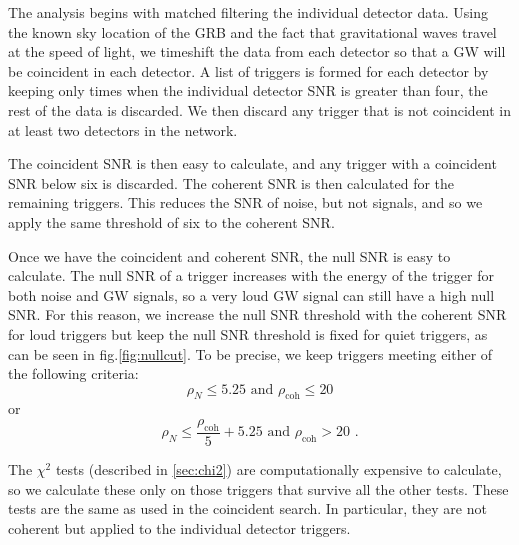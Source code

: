 \documentclass[11pt]{cuthesis}
\newcommand{\fs}{\text{ .}}
\begin{document}
The analysis begins with matched filtering the individual detector data. Using the known sky location of the GRB and the fact that gravitational waves travel at the speed of light, we timeshift the data from each detector so that a GW will be coincident in each detector. A list of triggers is formed for each detector by keeping only times when the individual detector SNR is greater than four, the rest of the data is discarded. We then discard any trigger that is not coincident in at least two detectors in the network. 

The coincident SNR is then easy to calculate, and any trigger with a coincident SNR below six is discarded. The coherent SNR is then calculated for the remaining triggers. This reduces the SNR of noise, but not signals, and so we apply the same threshold of six to the coherent SNR. 

Once we have the coincident and coherent SNR, the null SNR is easy to calculate. The null SNR of a trigger increases with the energy of the trigger for both noise and GW signals, so a very loud GW signal can still have a high null SNR. For this reason, we increase the null SNR threshold with the coherent SNR for loud triggers but keep the null SNR threshold is fixed for quiet triggers, as can be seen in fig.\ref{fig:nullcut}. To be precise, we keep triggers meeting either of the following criteria: 
\begin{equation}
\rho_N\leq5.25 \text{  and   } \rho_\text{coh}\leq 20
\end{equation} 
or
\begin{equation}
\rho_N \leq \frac{\rho_\text{coh}}{5}+5.25  \text{  and   } \rho_\text{coh}> 20 \fs
\end{equation}

The $\chi^2$ tests (described in \ref{sec:chi2}) are computationally expensive to calculate, so we calculate these only on those triggers that survive all the other tests. These tests are the same as used in the coincident search. In particular, they are not coherent but applied to the individual detector triggers. 
\end{document}

